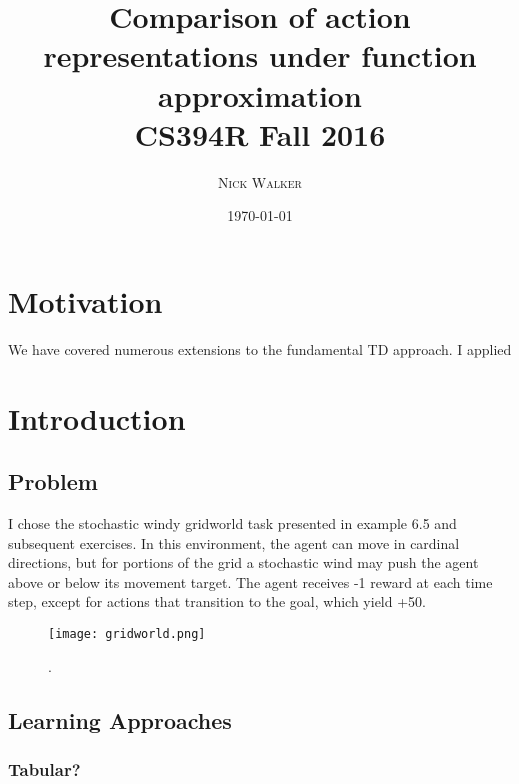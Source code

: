 \documentclass{article}
\title{Comparison of action representations under function approximation \\ \large CS394R Fall 2016} %
\author{\textsc{Nick Walker}} %
\date{\today} %
\begin{document}
	\maketitle %



	\section{Motivation}
	
	We have covered numerous extensions to the fundamental TD approach. I applied 




	\section{Introduction}

	\subsection{Problem}
	
	I chose the stochastic windy gridworld task presented in example 6.5 and subsequent exercises. In this environment, the agent can move in cardinal directions, but for portions of the grid a stochastic wind may push the agent above or below its movement target. The agent receives -1 reward at each time step, except for actions that transition to the goal, which yield +50.
	
			\begin{figure}[h]
				\begin{center}
					\texttt{[image: gridworld.png]}
					\caption{.}
				\end{center}
			\end{figure}


	\subsection{Learning Approaches}

	\subsubsection{Tabular?}
\end{document}
